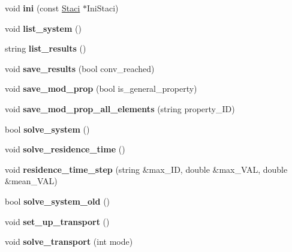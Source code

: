 \begin{DoxyCompactItemize}
void {\bfseries ini} (const \hyperlink{class_staci}{Staci} $\ast$Ini\+Staci)
\item 
\mbox{\label{class_staci_ae95917401c8454a747a24880faa20138}} 
void {\bfseries list\+\_\+system} ()
\item 
\mbox{\label{class_staci_a54bf8a354a57dbafda0bf775c66d6524}} 
string {\bfseries list\+\_\+results} ()
\item 
\mbox{\label{class_staci_a0cf78089da2693f039b4fe5e2b5c21d2}} 
void {\bfseries save\+\_\+results} (bool conv\+\_\+reached)
\item 
\mbox{\label{class_staci_a42bac4458094c023bc91dcb9ccf4a029}} 
void {\bfseries save\+\_\+mod\+\_\+prop} (bool is\+\_\+general\+\_\+property)
\item 
\mbox{\label{class_staci_a232a3767e1039491a83690f564702089}} 
void {\bfseries save\+\_\+mod\+\_\+prop\+\_\+all\+\_\+elements} (string property\+\_\+\+ID)
\item 
\mbox{\label{class_staci_a86917fe19f9c274dac7fbf5fd86e44ba}} 
bool {\bfseries solve\+\_\+system} ()
\item 
\mbox{\label{class_staci_a884616aaebef6a088c562e56c0f68525}} 
void {\bfseries solve\+\_\+residence\+\_\+time} ()
\item 
\mbox{\label{class_staci_a403aabb120769ddc037a69548b2c2134}} 
void {\bfseries residence\+\_\+time\+\_\+step} (string \&max\+\_\+\+ID, double \&max\+\_\+\+V\+AL, double \&mean\+\_\+\+V\+AL)
\item 
\mbox{\label{class_staci_ad9b04218bcc23ddc5b6e1d247f5ffb8f}} 
bool {\bfseries solve\+\_\+system\+\_\+old} ()
\item 
\mbox{\label{class_staci_ac71d40c423576c540b594c7e3a7f1365}} 
void {\bfseries set\+\_\+up\+\_\+transport} ()
\item 
\mbox{\label{class_staci_a8ac839cd977519ad3a6a6a5ba85f4d35}} 
void {\bfseries solve\+\_\+transport} (int mode)
\item 

\end{DoxyCompactItemize}
